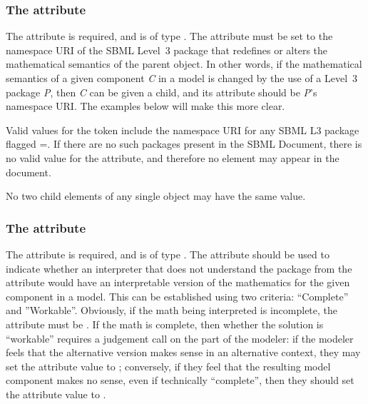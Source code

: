 \subsubsection{The \fixttspace{} attribute}
\label{attribute-changedBy}

The  attribute is required, and is of type .  The attribute must be set to the namespace URI of the SBML Level~3 package that redefines or alters the mathematical semantics of the parent object.  In other words, if the mathematical semantics of a given component \emph{C} in a model is changed by the use of a Level~3 package \emph{P}, then \emph{C} can be given a \MathChanged child, and its attribute  should be \emph{P}'s namespace URI.  The examples below will make this more clear.

Valid values for the  token include the namespace URI for any SBML L3 package flagged  =.  If there are no such packages present in the SBML Document, there is no valid value for the  attribute, and therefore no \MathChanged element may appear in the document.

No two child \MathChanged elements of any single \SBase object may have the same  value.  


\subsubsection{The \fixttspace{} attribute}
\label{attribute-absenceleavesalternative}

The  attribute is required, and is of type .  The attribute should be used to indicate whether an interpreter that does not understand the package from the  attribute would have an interpretable version of the mathematics for the given component in a model.  This can be established using two criteria:  ``Complete'' and ''Workable''.  Obviously, if the math being interpreted is incomplete, the  attribute must be .  If the math is complete, then whether the solution is ``workable'' requires a judgement call on the part of the modeler: if the modeler feels that the alternative version makes sense in an alternative context, they may set the attribute value to ; conversely, if they feel that the resulting model component makes no sense, even if technically ``complete'', then they should set the attribute value to .


